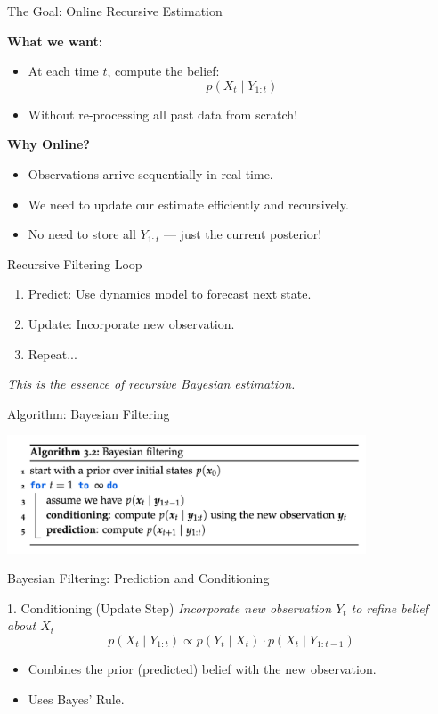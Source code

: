\documentclass[handout,aspectratio=169]{beamer}
\begin{document}
\begin{frame}{The Goal: Online Recursive Estimation}

\textbf{What we want:}
\begin{itemize}
  \item At each time \( t \), compute the belief:
  \[
    p(X_t \mid Y_{1:t})
  \]
  \item Without re-processing all past data from scratch!
\end{itemize}


\textbf{Why Online?}
\begin{itemize}
  \item Observations arrive sequentially in real-time.
  \item We need to update our estimate efficiently and recursively.
  \item No need to store all \( Y_{1:t} \) — just the current posterior!
\end{itemize}


\begin{block}{Recursive Filtering Loop}
\begin{enumerate}
  \item Predict: Use dynamics model to forecast next state.
  \item Update: Incorporate new observation.
  \item Repeat...
\end{enumerate}
\end{block}


\textit{This is the essence of recursive Bayesian estimation.}

\end{frame}

\begin{frame}{Algorithm: Bayesian Filtering}

\includegraphics[width=0.8\textwidth]{chapter_figs/03_figs/algorithm.png} 
\end{frame}

\begin{frame}{Bayesian Filtering: Prediction and Conditioning}
\begin{block}{1. Conditioning (Update Step)}
\textit{Incorporate new observation \( Y_t \) to refine belief about \( X_t \)}
\[
p(X_t \mid Y_{1:t}) \propto p(Y_t \mid X_t) \cdot p(X_t \mid Y_{1:t-1}) \tag{3.8}
\]
\begin{itemize}
  \item Combines the prior (predicted) belief with the new observation.
  \item Uses Bayes’ Rule.
\end{itemize}
\end{block}
\end{frame}
\end{document}
